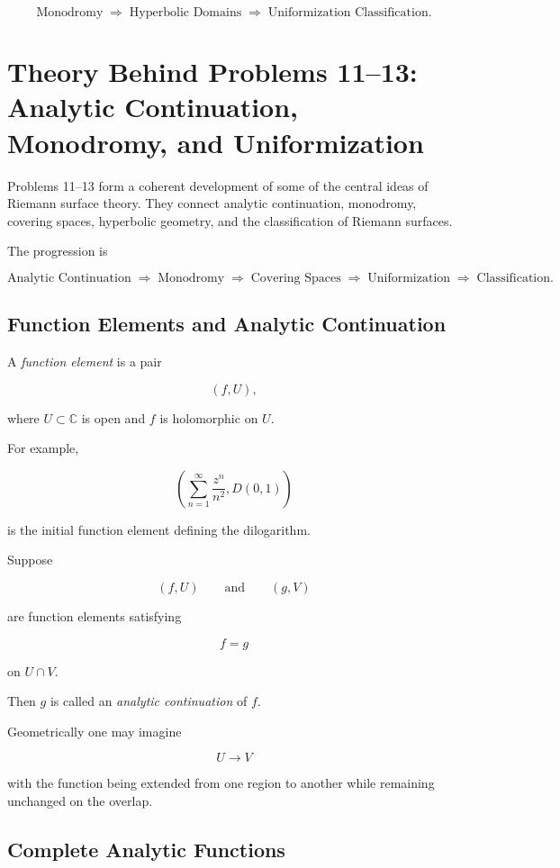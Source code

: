 \documentclass[12pt,a4paper]{article}
\theoremstyle{notespace}
\begin{document}
\[
\boxed{
	\text{Monodromy}
	\;\Longrightarrow\;
	\text{Hyperbolic Domains}
	\;\Longrightarrow\;
	\text{Uniformization Classification}.
}
\]

\section{Theory Behind Problems 11--13:
	Analytic Continuation, Monodromy, and Uniformization}

Problems 11--13 form a coherent development of some of the central ideas of Riemann surface theory. They connect analytic continuation, monodromy, covering spaces, hyperbolic geometry, and the classification of Riemann surfaces.

The progression is

\[
\text{Analytic Continuation}
\;\Longrightarrow\;
\text{Monodromy}
\;\Longrightarrow\;
\text{Covering Spaces}
\;\Longrightarrow\;
\text{Uniformization}
\;\Longrightarrow\;
\text{Classification}.
\]

\subsection{Function Elements and Analytic Continuation}

A \emph{function element} is a pair

\[
(f,U),
\]

where \(U\subset\mathbb C\) is open and \(f\) is holomorphic on \(U\).

For example,

\[
\left(
\sum_{n=1}^{\infty}\frac{z^n}{n^2},
D(0,1)
\right)
\]

is the initial function element defining the dilogarithm.

\medskip

Suppose

\[
(f,U)
\qquad\text{and}\qquad
(g,V)
\]

are function elements satisfying

\[
f=g
\]

on \(U\cap V\).

Then \(g\) is called an \emph{analytic continuation} of \(f\).

Geometrically one may imagine

\[
U \longrightarrow V
\]

with the function being extended from one region to another while remaining unchanged on the overlap.

\subsection{Complete Analytic Functions}
\end{document}
